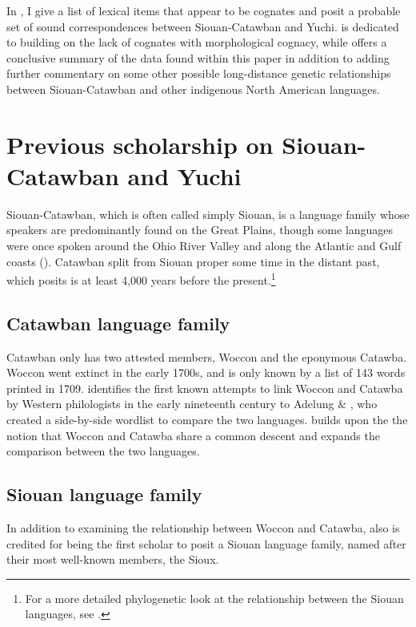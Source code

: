 \documentclass[output=paper]{LSP/langsci}
\begin{document}
In , I give a list of lexical items that appear to be cognates and posit a probable set of sound correspondences between Siouan-Catawban and Yuchi.  is dedicated to building on the lack of cognates with morphological cognacy, while  offers a conclusive summary of the data found within this paper in addition to adding further commentary on some other possible long-distance genetic relationships between Siouan-Catawban and other indigenous North American languages.

\section{Previous scholarship on Siouan-Catawban and Yuchi}

Siouan-Catawban, which is often called simply Siouan, is a language family whose speakers are predominantly found on the Great Plains, though some languages were once spoken around the Ohio River Valley and along the Atlantic and Gulf coasts (\citealt{Mithun1999}). Catawban split from Siouan proper some time in the distant past, which \citet{Rankin1996} posits is at least 4,000 years before the present.\footnote{For a more detailed phylogenetic look at the relationship between the Siouan languages, see \citet{Rankin2010}.}

\subsection{Catawban language family}

Catawban only has two attested members, Woccon and the eponymous Catawba. Woccon went extinct in the early 1700s, and is only known by a list of 143 words printed in 1709. \citet{Carter1980} identifies the first known attempts to link Woccon and Catawba by Western philologists in the early nineteenth century to Adelung \& \citet{Vater1816}, who created a side-by-side wordlist to compare the two languages. \citet{Gallatin1836} builds upon the the notion that Woccon and Catawba share a common descent and expands the comparison between the two languages.

\subsection{Siouan language family}

In addition to examining the relationship between Woccon and Catawba, \citet{Gallatin1836} also is credited for being the first scholar to posit a Siouan language family, named after their most well-known members, the Sioux. 
\end{document}

